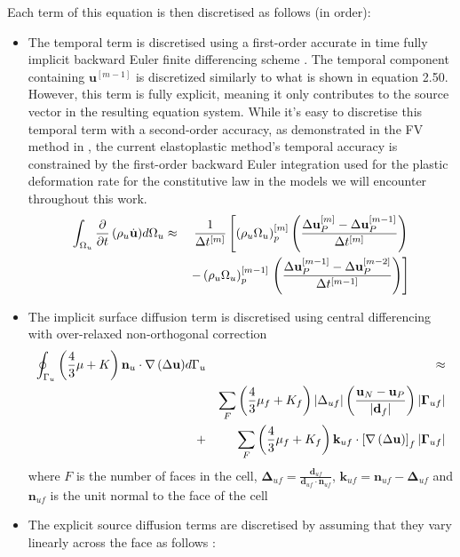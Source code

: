 \documentclass[sn-mathphys,Numbered,draft]{sn-jnl}%
\begin{document}
Each term of this equation is then discretised as follows (in order):
\begin{itemize}
	\item The temporal term is discretised using a first-order accurate in time fully implicit backward Euler finite differencing scheme \cite{jasak_application_2000}. The temporal component containing $\mathbf{u}^{\left[m-1\right]}$ is discretized similarly to what is shown in equation 2.50. However, this term is fully explicit, meaning it only contributes to the source vector in the resulting equation system. While it's easy to discretise this temporal term with a second-order accuracy, as demonstrated in the FV method in \citet{jasak_application_2000}, the current elastoplastic method's temporal accuracy is constrained by the first-order backward Euler integration used for the plastic deformation rate for the constitutive law in the models we will encounter throughout this work.
\begin{eqnarray}
	\int_{\mathrm{\Omega}_u}{\frac{\partial}{\partial t}\left(\rho_u\dot{\mathbf{u} }\right)}d\mathrm{\Omega}_u &\approx&\ \frac{1}{\mathrm{\Delta}t^{\left[m\right]}}\left[\left(\rho_u\mathrm{\Omega}_u\right)_p^{\left[m\right]}\left(\frac{\mathrm{\Delta}\mathbf{u}_P^{\left[m\right]}-\mathrm{\Delta}\mathbf{u}_P^{\left[m-1\right]}}{\mathrm{\Delta}t^{\left[m\right]}}\right)\right. \notag \\
 &&-\left(\rho_u\mathrm{\Omega}_u\right)_p^{\left[m-1\right]}\left.\left(\frac{\mathrm{\Delta}\mathbf{u}_P^{\left[m-1\right]}-\mathrm{\Delta}\mathbf{u}_P^{\left[m-2\right]}}{\mathrm{\Delta}t^{\left[m-1\right]}}\right)\right]
\end{eqnarray}
	\item The implicit surface diffusion term is discretised using central differencing with over-relaxed non-orthogonal correction \cite{demirdzic_finite_1993,jasak_application_2000,cardiff_development_2014,cardiff_large_2014}
\begin{eqnarray}
\oint_{\mathrm{\Gamma}_u}{\left(\frac{4}{3}\mu+K\right)\mathbf{n}_u\cdot\nabla\left(\Delta\mathbf{u}\right)}d\mathrm{\Gamma}_u&&\approx \notag \\
&&\sum_{F}\left(\frac{4}{3}\mu_f+K_f\right)\left|\Delta_{uf}\right|\left(\frac{\mathbf{u}_N-\mathbf{u}_P}{\left|\mathbf{d}_f\right|}\right)\left|\mathbf{\Gamma}_{uf}\right| \notag \\
	    +&&\sum_{F}\left(\frac{4}{3}\mu_f+K_f\right)\mathbf{k}_{uf}\cdot\left[\nabla\left(\mathrm{\Delta}\mathbf{u}\right)\right]_f\left|\mathbf{\Gamma}_{uf}\right|
     \end{eqnarray}
where $F$ is the number of faces in the cell, $\boldsymbol{\Delta}_{u f}=\frac{\boldsymbol{d}_{u f}}{\boldsymbol{d}_{u f} \cdot \boldsymbol{n}_{u f}}$, $\boldsymbol{k}_{u f}=\boldsymbol{n}_{u f}-\boldsymbol{\Delta}_{u f}$ and $\boldsymbol{n}_{u f}$ is the unit normal to the face of the cell
	\item The explicit source diffusion terms are discretised by assuming that they vary linearly across the face as follows \cite{noauthor_openfoam_2015}:
	

\end{itemize}
\end{document}
